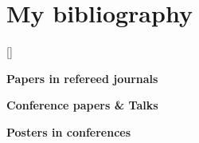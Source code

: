 \documentclass[letter,10pt]{article} %
\begin{document}
\section{My bibliography}

{\begin{enumerate}
{\setlength{\leftmargin}{\bibhang}%
\setlength{\itemindent}{-\leftmargin}%
\setlength{\itemsep}{\bibitemsep}%
\setlength{\parsep}{\bibparsep}}}
{\end{enumerate}}
{\item}

[\bibname]{ }

\nocite{*}

{\bf Papers in refereed journals}
\printbibliography[type=article]

{\bf Conference papers \& Talks}
\printbibliography[type=inproceedings]

{\bf Posters in conferences}
\printbibliography[type=proceedings]
\end{document}
